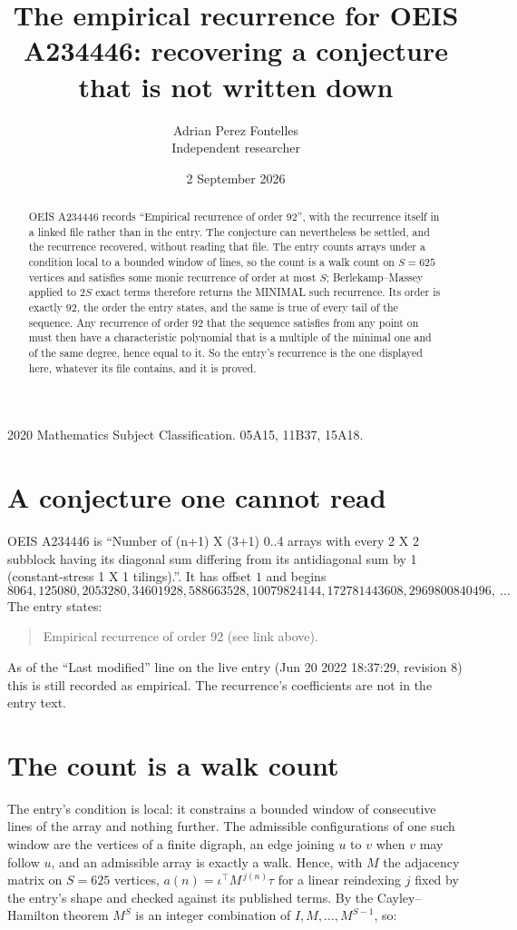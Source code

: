 \documentclass[11pt,a4paper]{article}
\title{The empirical recurrence for OEIS A234446: recovering a conjecture that is not written down}
\author{Adrian Perez Fontelles\\ \small Independent researcher}
\date{2 September 2026}
\theoremstyle{plain}
\theoremstyle{definition}
\begin{document}
\maketitle

\begin{abstract}
OEIS A234446 records ``Empirical recurrence of order $92$'', with the recurrence itself in a
linked file rather than in the entry. The conjecture can nevertheless be settled, and the
recurrence recovered, without reading that file. The entry counts arrays under a condition
local to a bounded window of lines, so the count is a walk count on $S=625$ vertices and
satisfies some monic recurrence of order at most $S$; Berlekamp--Massey applied to $2S$ exact
terms therefore returns the MINIMAL such recurrence. Its order is exactly $92$, the order
the entry states, and the same is true of every tail of the sequence. Any recurrence of order
$92$ that the sequence satisfies from any point on must then have a characteristic
polynomial that is a multiple of the minimal one and of the same degree, hence equal to it. So
the entry's recurrence is the one displayed here, whatever its file contains, and it is
proved.
\end{abstract}

\noindent\small 2020 Mathematics Subject Classification. 05A15, 11B37, 15A18.\normalsize

\section{A conjecture one cannot read}

OEIS A234446 is ``Number of (n+1) X (3+1) 0..4 arrays with every 2 X 2 subblock having its diagonal sum differing from its antidiagonal sum by 1 (constant-stress 1 X 1 tilings).''. It has offset $1$ and begins
\[
8064, 125080, 2053280, 34601928, 588663528, 10079824144, 172781443608, 2969800840496,\ \dots
\]
The entry states:
\begin{quote}
Empirical recurrence of order 92 (see link above).
\end{quote}
As of the ``Last modified'' line on the live entry (Jun 20 2022 18:37:29, revision 8) this is still
recorded as empirical. The recurrence's coefficients are not in the entry text.

\section{The count is a walk count}

The entry's condition is local: it constrains a bounded window of consecutive lines of the
array and nothing further. The admissible configurations of one such window are the vertices
of a finite digraph, an edge joining $u$ to $v$ when $v$ may follow $u$, and an admissible
array is exactly a walk. Hence, with $M$ the adjacency matrix on $S=625$ vertices,
$a(n)=\iota^{\!\top}M^{\,j(n)}\tau$ for a linear reindexing $j$ fixed by the entry's shape
and checked against its published terms. By the Cayley--Hamilton theorem $M^{S}$ is an
integer combination of $I,M,\dots,M^{S-1}$, so:
\end{document}
